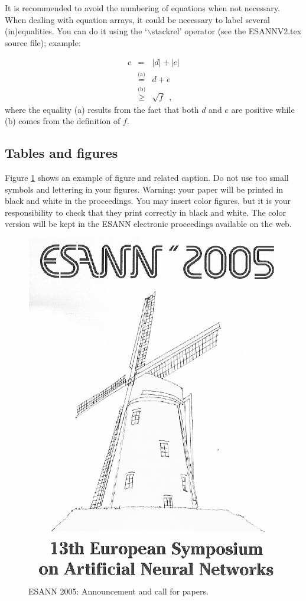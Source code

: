\documentclass{esannV2}
\begin{document}
It is recommended to avoid the numbering of equations when not
necessary. When dealing with equation arrays, it could be
necessary to label several (in)equalities. You can do it using the
`$\backslash$stackrel' operator (see the ESANNV2.tex source file);
example:

\begin{eqnarray}
c&=&|d|+|e|\nonumber\\
&\stackrel{\text{(a)}}{=}&d+e\nonumber\\
&\stackrel{\text{(b)}}{\geq}&\sqrt{f}\enspace,
\end{eqnarray}
\noindent where the equality (a) results from the fact that both
$d$ and $e$ are positive while (b) comes from the definition of
$f$.

\subsection{Tables and figures}

Figure \ref{Fig:MV} shows an example of figure and related
caption.  Do not use too small symbols and lettering in your
figures.  Warning: your paper will be printed in black and white
in the proceedings.  You may insert color figures, but it is your
responsibility to check that they print correctly in black and
white.  The color version will be kept in the ESANN electronic
proceedings available on the web.

\begin{figure}[h!]
\centering
\includegraphics[scale=0.6]{ESANN2005BW.eps}
\caption{ESANN 2005: Announcement and call for
papers.}\label{Fig:MV}
\end{figure}
\end{document}
